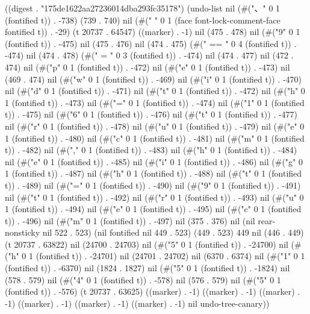
((digest . "175de1622aa27236014dba293fc35178") (undo-list nil (#("、" 0 1 (fontified t)) . -738) (739 . 740) nil (#(" " 0 1 (face font-lock-comment-face fontified t)) . -29) (t 20737 . 64547) ((marker) . -1) nil (475 . 478) nil (#("9" 0 1 (fontified t)) . -475) nil (475 . 476) nil (474 . 475) (#(" == " 0 4 (fontified t)) . -474) nil (474 . 478) (#(" = " 0 3 (fontified t)) . -474) nil (474 . 477) nil (472 . 474) nil (#("p" 0 1 (fontified t)) . -472) nil (#("e" 0 1 (fontified t)) . -473) nil (469 . 474) nil (#("w" 0 1 (fontified t)) . -469) nil (#("i" 0 1 (fontified t)) . -470) nil (#("d" 0 1 (fontified t)) . -471) nil (#("t" 0 1 (fontified t)) . -472) nil (#("h" 0 1 (fontified t)) . -473) nil (#("=" 0 1 (fontified t)) . -474) nil (#("1" 0 1 (fontified t)) . -475) nil (#("6" 0 1 (fontified t)) . -476) nil (#("t" 0 1 (fontified t)) . -477) nil (#("r" 0 1 (fontified t)) . -478) nil (#("u" 0 1 (fontified t)) . -479) nil (#("e" 0 1 (fontified t)) . -480) nil (#("c" 0 1 (fontified t)) . -481) nil (#("m" 0 1 (fontified t)) . -482) nil (#("," 0 1 (fontified t)) . -483) nil (#("h" 0 1 (fontified t)) . -484) nil (#("e" 0 1 (fontified t)) . -485) nil (#("i" 0 1 (fontified t)) . -486) nil (#("g" 0 1 (fontified t)) . -487) nil (#("h" 0 1 (fontified t)) . -488) nil (#("t" 0 1 (fontified t)) . -489) nil (#("=" 0 1 (fontified t)) . -490) nil (#("9" 0 1 (fontified t)) . -491) nil (#("t" 0 1 (fontified t)) . -492) nil (#("r" 0 1 (fontified t)) . -493) nil (#("u" 0 1 (fontified t)) . -494) nil (#("e" 0 1 (fontified t)) . -495) nil (#("c" 0 1 (fontified t)) . -496) nil (#("m" 0 1 (fontified t)) . -497) nil (375 . 376) nil (nil rear-nonsticky nil 522 . 523) (nil fontified nil 449 . 523) (449 . 523) 449 nil (446 . 449) (t 20737 . 63822) nil (24700 . 24703) nil (#("5" 0 1 (fontified t)) . -24700) nil (#("h" 0 1 (fontified t)) . -24701) nil (24701 . 24702) nil (6370 . 6374) nil (#("1" 0 1 (fontified t)) . -6370) nil (1824 . 1827) nil (#("5" 0 1 (fontified t)) . -1824) nil (578 . 579) nil (#("4" 0 1 (fontified t)) . -578) nil (576 . 579) nil (#("5" 0 1 (fontified t)) . -576) (t 20737 . 63625) ((marker) . -1) ((marker) . -1) ((marker) . -1) ((marker) . -1) ((marker) . -1) ((marker) . -1) nil undo-tree-canary))

